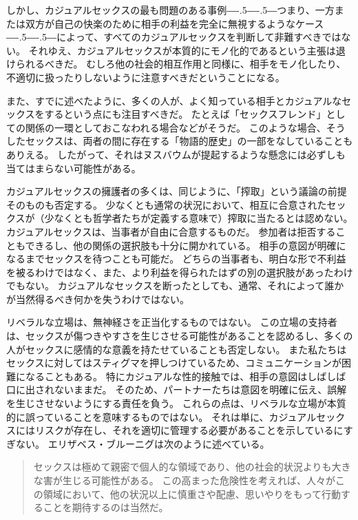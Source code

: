 \documentclass[paper=a4,book,openany]{jlreq}
\def\DDASH{―\kern-.5\zw―\kern-.5\zw―}
\begin{document}
しかし、カジュアルセックスの最も問題のある事例{\DDASH}つまり、一方または双方が自己の快楽のために相手の利益を完全に無視するようなケース{\DDASH}によって、すべてのカジュアルセックスを判断して非難すべきではない。
それゆえ、カジュアルセックスが本質的にモノ化的であるという主張は退けられるべきだ。
むしろ他の社会的相互作用と同様に、相手をモノ化したり、不適切に扱ったりしないように注意すべきだということになる。

また、すでに述べたように、多くの人が、よく知っている相手とカジュアルなセックスをするという点にも注目すべきだ。
たとえば「セックスフレンド」としての関係の一環としておこなわれる場合などがそうだ。
このような場合、そうしたセックスは、両者の間に存在する「物語的歴史」の一部をなしていることもありえる。
したがって、それはヌスバウムが提起するような懸念には必ずしも当てはまらない可能性がある。

カジュアルセックスの擁護者の多くは、同じように、「搾取」という議論の前提そのものも否定する。
少なくとも通常の状況において、相互に合意されたセックスが（少なくとも哲学者たちが定義する意味で）搾取に当たるとは認めない。
カジュアルセックスは、当事者が自由に合意するものだ。
参加者は拒否することもできるし、他の関係の選択肢も十分に開かれている。
相手の意図が明確になるまでセックスを待つことも可能だ。
どちらの当事者も、明白な形で不利益を被るわけではなく、また、より利益を得られたはずの別の選択肢があったわけでもない。
カジュアルなセックスを断ったとしても、通常、それによって誰かが当然得るべき何かを失うわけではない。

リベラルな立場は、無神経さを正当化するものではない。
この立場の支持者は、セックスが傷つきやすさを生じさせる可能性があることを認めるし、多くの人がセックスに感情的な意義を持たせていることも否定しない。
また私たちはセックスに対してはスティグマを押しつけているため、コミュニケーションが困難になることもある。
特にカジュアルな性的接触では、相手の意図はしばしば口に出されないままだ。
そのため、パートナーたちは意図を明確に伝え、誤解を生じさせないようにする責任を負う。
これらの点は、リベラルな立場が本質的に誤っていることを意味するものではない。
それは単に、カジュアルセックスにはリスクが存在し、それを適切に管理する必要があることを示しているにすぎない。
エリザベス・ブルーニグは次のように述べている。

\begin{quote}
  セックスは極めて親密で個人的な領域であり、他の社会的状況よりも大きな害が生じる可能性がある。
この高まった危険性を考えれば、人々がこの領域において、他の状況以上に慎重さや配慮、思いやりをもって行動することを期待するのは当然だ。
\citep{bruenig18:_aziz_ansar_debac}

\end{quote}
\end{document}
